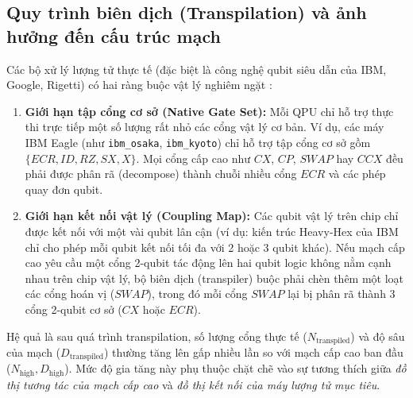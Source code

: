 \documentclass[11pt, a4paper]{article}
\begin{document}
\subsection{Quy trình biên dịch (Transpilation) và ảnh hưởng đến cấu trúc mạch}
Các bộ xử lý lượng tử thực tế (đặc biệt là công nghệ qubit siêu dẫn của IBM, Google, Rigetti) có hai ràng buộc vật lý nghiêm ngặt \cite{quetschlich2023mqtpredictor}:
\begin{enumerate}
    \item \textbf{Giới hạn tập cổng cơ sở (Native Gate Set):} Mỗi QPU chỉ hỗ trợ thực thi trực tiếp một số lượng rất nhỏ các cổng vật lý cơ bản. Ví dụ, các máy IBM Eagle (như \texttt{ibm\_osaka}, \texttt{ibm\_kyoto}) chỉ hỗ trợ tập cổng cơ sở gồm $\{ECR, ID, RZ, SX, X\}$. Mọi cổng cấp cao như $CX$, $CP$, $SWAP$ hay $CCX$ đều phải được phân rã (decompose) thành chuỗi nhiều cổng $ECR$ và các phép quay đơn qubit.
    \item \textbf{Giới hạn kết nối vật lý (Coupling Map):} Các qubit vật lý trên chip chỉ được kết nối với một vài qubit lân cận (ví dụ: kiến trúc Heavy-Hex của IBM chỉ cho phép mỗi qubit kết nối tối đa với 2 hoặc 3 qubit khác). Nếu mạch cấp cao yêu cầu một cổng 2-qubit tác động lên hai qubit logic không nằm cạnh nhau trên chip vật lý, bộ biên dịch (transpiler) buộc phải chèn thêm một loạt các cổng hoán vị ($SWAP$), trong đó mỗi cổng $SWAP$ lại bị phân rã thành 3 cổng 2-qubit cơ sở ($CX$ hoặc $ECR$).
\end{enumerate}

Hệ quả là sau quá trình transpilation, số lượng cổng thực tế ($N_{\text{transpiled}}$) và độ sâu của mạch ($D_{\text{transpiled}}$) thường tăng lên gấp nhiều lần so với mạch cấp cao ban đầu ($N_{\text{high}}, D_{\text{high}}$). Mức độ gia tăng này phụ thuộc chặt chẽ vào sự tương thích giữa \textit{đồ thị tương tác của mạch cấp cao} và \textit{đồ thị kết nối của máy lượng tử mục tiêu}.
\end{document}
